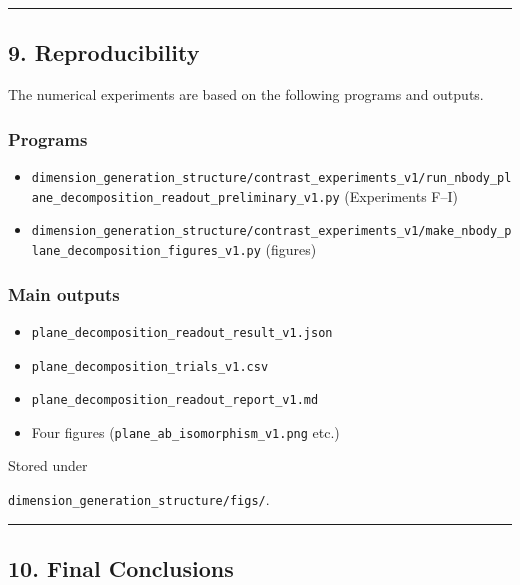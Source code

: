 \documentclass[
  a4paper,
]{article}
\providecommand{\tightlist}{%
  \setlength{\itemsep}{0pt}\setlength{\parskip}{0pt}}
\begin{document}
\begin{center}\rule{0.5\linewidth}{0.5pt}\end{center}

\subsection{9. Reproducibility}\label{reproducibility}

The numerical experiments are based on the following programs and
outputs.

\subsubsection{Programs}\label{programs}

\begin{itemize}
\tightlist
\item
  \texttt{dimension\_generation\_structure/contrast\_experiments\_v1/run\_nbody\_plane\_decomposition\_readout\_preliminary\_v1.py}
  (Experiments F--I)
\item
  \texttt{dimension\_generation\_structure/contrast\_experiments\_v1/make\_nbody\_plane\_decomposition\_figures\_v1.py}
  (figures)
\end{itemize}

\subsubsection{Main outputs}\label{main-outputs}

\begin{itemize}
\tightlist
\item
  \texttt{plane\_decomposition\_readout\_result\_v1.json}
\item
  \texttt{plane\_decomposition\_trials\_v1.csv}
\item
  \texttt{plane\_decomposition\_readout\_report\_v1.md}
\item
  Four figures (\texttt{plane\_ab\_isomorphism\_v1.png} etc.)
\end{itemize}

Stored under

\texttt{dimension\_generation\_structure/figs/}.

\begin{center}\rule{0.5\linewidth}{0.5pt}\end{center}

\subsection{10. Final Conclusions}\label{final-conclusions}
\end{document}
